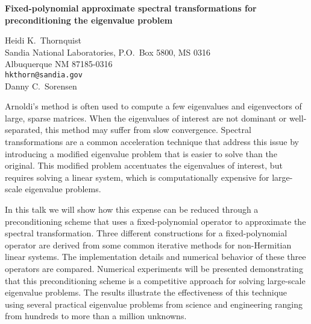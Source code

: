 \documentclass{report}
\begin{document}

\begin{center}
{\large
{\bf Fixed-polynomial approximate spectral transformations for \\
	preconditioning the eigenvalue problem}}

	Heidi K.~Thornquist \\
	Sandia National Laboratories, P.O.~Box 5800, MS 0316 \\
	Albuquerque NM 87185-0316 \\
	{\tt hkthorn@sandia.gov} \\
	Danny C.~Sorensen
\end{center}
Arnoldi's method is often used to compute a few eigenvalues
and eigenvectors of large, sparse matrices. When the
eigenvalues of interest are not dominant or well-separated,
this method may suffer from slow convergence. Spectral
transformations are a common acceleration technique that
address this issue by introducing a modified eigenvalue
problem that is easier to solve than the original. This
modified problem accentuates the eigenvalues of interest,
but requires solving a linear system, which is
computationally expensive for large-scale eigenvalue
problems.

In this talk we will show how this expense can
be reduced through a preconditioning scheme that uses a
fixed-polynomial operator to approximate the spectral
transformation. Three different constructions for a
fixed-polynomial operator are derived from some common
iterative methods for non-Hermitian linear systems. The
implementation details and numerical behavior of these three
operators are compared. Numerical experiments will be
presented demonstrating that this preconditioning scheme is
a competitive approach for solving large-scale eigenvalue
problems. The results illustrate the effectiveness of this
technique using several practical eigenvalue problems from
science and engineering ranging from hundreds to more than a
million unknowns.



\end{document}
